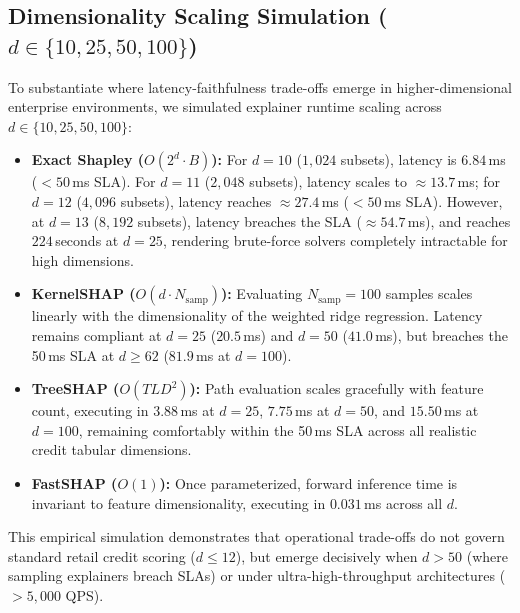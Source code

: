 \documentclass[conference]{IEEEtran}
\begin{document}
\subsection{Dimensionality Scaling Simulation ($d \in \{10, 25, 50, 100\}$)}
To substantiate where latency-faithfulness trade-offs emerge in higher-dimensional enterprise environments, we simulated explainer runtime scaling across $d \in \{10, 25, 50, 100\}$:
\begin{itemize}
    \item \textbf{Exact Shapley ($O(2^d \cdot B)$):} For $d=10$ ($1,024$ subsets), latency is $6.84$\,ms ($<50$\,ms SLA). For $d=11$ ($2,048$ subsets), latency scales to $\approx 13.7$\,ms; for $d=12$ ($4,096$ subsets), latency reaches $\approx 27.4$\,ms ($<50$\,ms SLA). However, at $d=13$ ($8,192$ subsets), latency breaches the SLA ($\approx 54.7$\,ms), and reaches $224$\,seconds at $d=25$, rendering brute-force solvers completely intractable for high dimensions.
    \item \textbf{KernelSHAP ($O(d \cdot N_{\text{samp}})$):} Evaluating $N_{\text{samp}}=100$ samples scales linearly with the dimensionality of the weighted ridge regression. Latency remains compliant at $d=25$ ($20.5$\,ms) and $d=50$ ($41.0$\,ms), but breaches the 50\,ms SLA at $d \ge 62$ ($81.9$\,ms at $d=100$).
    \item \textbf{TreeSHAP ($O(TLD^2)$):} Path evaluation scales gracefully with feature count, executing in $3.88$\,ms at $d=25$, $7.75$\,ms at $d=50$, and $15.50$\,ms at $d=100$, remaining comfortably within the 50\,ms SLA across all realistic credit tabular dimensions.
    \item \textbf{FastSHAP ($O(1)$):} Once parameterized, forward inference time is invariant to feature dimensionality, executing in $0.031$\,ms across all $d$.
\end{itemize}
This empirical simulation demonstrates that operational trade-offs do not govern standard retail credit scoring ($d \le 12$), but emerge decisively when $d > 50$ (where sampling explainers breach SLAs) or under ultra-high-throughput architectures ($>5,000$ QPS).
\end{document}
